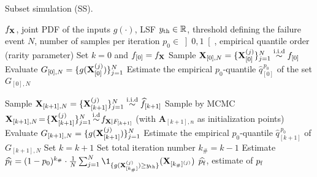 \begin{algorithm}[h]
    \caption{Subset simulation (SS).}\label{alg:ss}
    \footnotesize
    \begin{algorithmic}
        \State $f_{\bf X}$, joint PDF of the inputs
        \State $g(\cdot)$, LSF
        \State $y_\mathrm{th} \in \mathbb{R}$, threshold defining the failure event 
        \State $N$, number of samples per iteration
        \State $p_0 \in \left]0, 1\right[$, empirical quantile order (rarity parameter)
        \State Set $k = 0$ and $f_{[0]} = f_{\bf X}$
        \State Sample ${\bf X}_{[0], N} = \{{\bf X}_{[0]}^{(j)}\}_{j=1}^N \overset{\text{i.i.d}}{\sim} f_{[0]}$
        \State Evaluate $G_{[0], N} = \{g({\bf X}_{[0]}^{(j)})\}_{j=1}^N$
        \State Estimate the empirical $p_0$-quantile $\widehat{q}_{[0]}^{\, p_0}$ of the set $G_{[0], N}$
        
        \State Sample ${\bf X}_{[k+1], N} = \{{\bf X}_{[k+1]}^{(j)}\}_{j=1}^N \overset{\text{i.i.d}}{\sim} \widehat{f}_{[k+1]}$
        \State Sample by MCMC ${\bf X}_{[k+1], N} \!=\! \{{\bf X}_{[k+1]}^{(j)}\}_{j=1}^N \!\overset{\text{i.d}}{\sim}\! f_{{\bf X} | F_{[k+1]}}$ (with $\mathbf{A}_{[k+1], n}$ as initialization points)
        \State Evaluate $G_{[k+1], N} = \{g({\bf X}_{[k+1]}^{(j)})\}_{j=1}^N$
        \State Estimate the empirical $p_0$-quantile $\widehat{q}_{[k+1]}^{\, p_0}$ of $G_{[k+1], N}$
        \State Set $k = k+1$
        \EndWhile
        \State Set total iteration number $k_\# = k-1$ 
        \State Estimate $\widehat{\pf} = (1 - p_0)^{k_\#} \cdot \frac{1}{N} \sum_{j=1}^N \1_{\{g(\bX_{[k_\#]}^{(j)}) \geq \yth  \}}(\bX_{[k_\#]^{(j)}}) $
        \State $\widehat{p_\mathrm{f}}$, estimate of $p_\mathrm{f}$
    \end{algorithmic}
    \end{algorithm}












